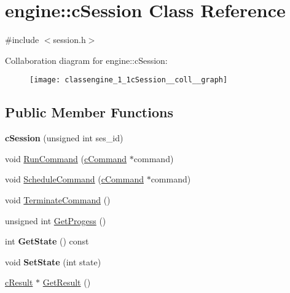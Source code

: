 \hypertarget{classengine_1_1cSession}{\section{engine\-:\-:c\-Session \-Class \-Reference}
\label{classengine_1_1cSession}
}


{\ttfamily \#include $<$session.\-h$>$}



\-Collaboration diagram for engine\-:\-:c\-Session\-:
\nopagebreak
\begin{figure}[H]
\begin{center}
\leavevmode
\texttt{[image: classengine\_1\_1cSession\_\_coll\_\_graph]}
\end{center}
\end{figure}
\subsection*{\-Public \-Member \-Functions}
\begin{DoxyCompactItemize}
\item 
\hypertarget{classengine_1_1cSession_aafe0e5fd946fd5fa5b990617f848a5a5}{{\bfseries c\-Session} (unsigned int ses\-\_\-id)}\label{classengine_1_1cSession_aafe0e5fd946fd5fa5b990617f848a5a5}

\item 
void \hyperlink{classengine_1_1cSession_a79226f269db0a276764656791d7689f2}{\-Run\-Command} (\hyperlink{classengine_1_1cCommand}{c\-Command} $\ast$command)
\item 
void \hyperlink{classengine_1_1cSession_afcf61cec37829291b2aa8e13d2ca96e0}{\-Schedule\-Command} (\hyperlink{classengine_1_1cCommand}{c\-Command} $\ast$command)
\item 
void \hyperlink{classengine_1_1cSession_af1a1747cd7020bd4bfce782bf1ffec5d}{\-Terminate\-Command} ()
\item 
unsigned int \hyperlink{classengine_1_1cSession_ab5b73d57f8d6fd918d33b4e0a64c21d9}{\-Get\-Progess} ()
\item 
\hypertarget{classengine_1_1cSession_a4d5cfbd1a1a5d1ff022fd4915b256f4f}{int {\bfseries \-Get\-State} () const }\label{classengine_1_1cSession_a4d5cfbd1a1a5d1ff022fd4915b256f4f}

\item 
\hypertarget{classengine_1_1cSession_ac70dfa95b25fed14a6ca32df68cf1300}{void {\bfseries \-Set\-State} (int state)}\label{classengine_1_1cSession_ac70dfa95b25fed14a6ca32df68cf1300}

\item 
\hyperlink{classengine_1_1cResult}{c\-Result} $\ast$ \hyperlink{classengine_1_1cSession_aa403617485890fe288c5cf68b39ab540}{\-Get\-Result} ()
\end{DoxyCompactItemize}

